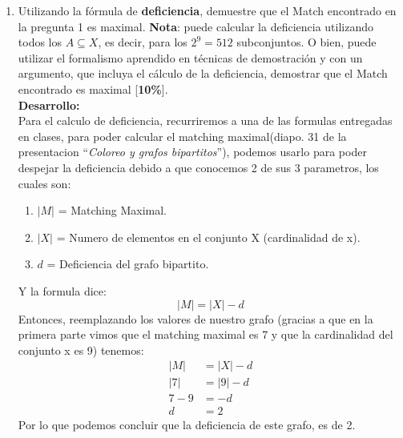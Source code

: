 \documentclass[letterpaper,10pt]{article}
\begin{document}
\begin{enumerate}[1.]
\item Utilizando la fórmula de \textbf{deficiencia}, demuestre que el Match encontrado en la pregunta 1 es maximal. \textbf{Nota}: puede calcular la deficiencia utilizando todos los $A\subseteq X$, es decir, para los $2^9 = 512$ subconjuntos. O bien, puede utilizar el formalismo aprendido en técnicas de demostración y con un argumento, que incluya el cálculo de la deficiencia, demostrar que el Match encontrado es maximal [\textbf{10\%}]. \\
\newline
\textbf{Desarrollo:}\\
\newline
Para el calculo de deficiencia, recurriremos a una de las formulas entregadas en clases, para poder calcular el matching maximal(diapo. 31 de la presentacion ``\textit{Coloreo y grafos bipartitos}''), podemos usarlo para poder despejar la deficiencia debido a que conocemos 2 de sus 3 parametros, los cuales son:
\begin{enumerate}
    \item $|M|$ = Matching Maximal.
    \item $|X|$ = Numero de elementos en el conjunto X (cardinalidad de x).
    \item $d$ = Deficiencia del grafo bipartito.
\end{enumerate}
Y la formula dice:
\begin{equation*}
    |M|=|X|-d
\end{equation*}
Entonces, reemplazando los valores de nuestro grafo (gracias a que en la primera parte vimos que el matching maximal es 7 y que la cardinalidad del conjunto x es 9) tenemos:
\begin{align*}
    |M| &=|X|-d\\
    |7| &= |9| -d\\
    7-9 &= -d\\
    d &= 2
\end{align*}
Por lo que podemos concluir que la deficiencia de este grafo, es de 2.\\








\end{enumerate}
\end{document}
